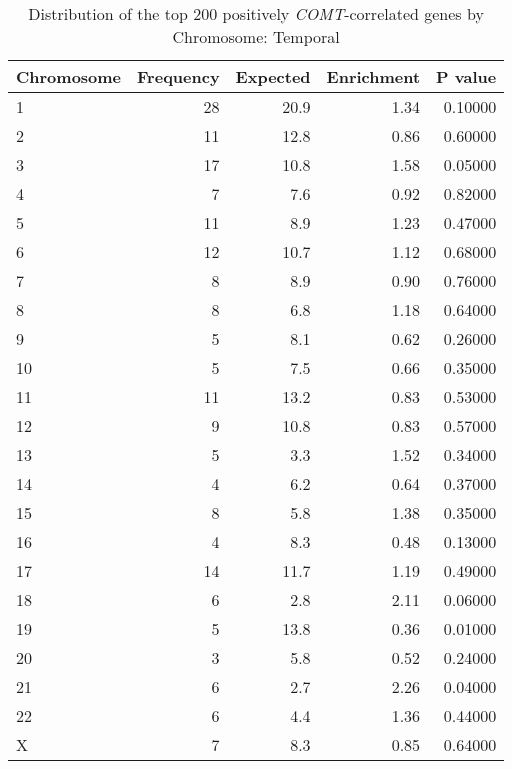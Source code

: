 \begin{longtable}{lrrrr}
\caption{Distribution of the top 200 positively \textit{COMT}-correlated genes by \\ Chromosome: Temporal} \\ 
  \toprule
Chromosome & Frequency & Expected & Enrichment & P value \\ 
  \midrule
1 & 28 & 20.9 & 1.34 & 0.10000 \\ 
  2 & 11 & 12.8 & 0.86 & 0.60000 \\ 
  3 & 17 & 10.8 & 1.58 & 0.05000 \\ 
  4 & 7 & 7.6 & 0.92 & 0.82000 \\ 
  5 & 11 & 8.9 & 1.23 & 0.47000 \\ 
  6 & 12 & 10.7 & 1.12 & 0.68000 \\ 
  7 & 8 & 8.9 & 0.90 & 0.76000 \\ 
  8 & 8 & 6.8 & 1.18 & 0.64000 \\ 
  9 & 5 & 8.1 & 0.62 & 0.26000 \\ 
  10 & 5 & 7.5 & 0.66 & 0.35000 \\ 
  11 & 11 & 13.2 & 0.83 & 0.53000 \\ 
  12 & 9 & 10.8 & 0.83 & 0.57000 \\ 
  13 & 5 & 3.3 & 1.52 & 0.34000 \\ 
  14 & 4 & 6.2 & 0.64 & 0.37000 \\ 
  15 & 8 & 5.8 & 1.38 & 0.35000 \\ 
  16 & 4 & 8.3 & 0.48 & 0.13000 \\ 
  17 & 14 & 11.7 & 1.19 & 0.49000 \\ 
  18 & 6 & 2.8 & 2.11 & 0.06000 \\ 
  19 & 5 & 13.8 & 0.36 & 0.01000 \\ 
  20 & 3 & 5.8 & 0.52 & 0.24000 \\ 
  21 & 6 & 2.7 & 2.26 & 0.04000 \\ 
  22 & 6 & 4.4 & 1.36 & 0.44000 \\ 
  X & 7 & 8.3 & 0.85 & 0.64000 \\ 
   \bottomrule
\end{longtable}
